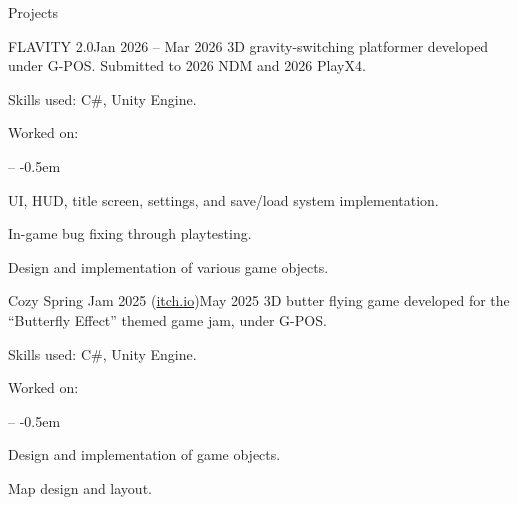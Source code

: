\documentclass{resume}
\begin{document}
\begin{res-section}{Projects}
  \begin{res-subsection}{FLAVITY 2.0}{Jan 2026 -- Mar 2026}
    3D gravity-switching platformer developed under G-POS. Submitted to 2026 NDM and 2026 PlayX4.

    \item Skills used: C\#, Unity Engine.
    \item Worked on:
    \vspace{-0.5em}
    \begin{list}{--}{}
      \itemsep -0.5em
      \item UI, HUD, title screen, settings, and save/load system implementation.
      \item In-game bug fixing through playtesting.
      \item Design and implementation of various game objects.
    \end{list}
  \end{res-subsection}

  \begin{res-subsection}{Cozy Spring Jam 2025 (\href{https://swm493.itch.io/butter-fly}{itch.io})}{May 2025}
    3D butter flying game developed for the ``Butterfly Effect'' themed game jam, under G-POS.

    \item Skills used: C\#, Unity Engine.
    \item Worked on:
    \vspace{-0.5em}
    \begin{list}{--}{}
      \itemsep -0.5em
      \item Design and implementation of game objects.
      \item Map design and layout.
    \end{list}
  \end{res-subsection}
\end{res-section}

\end{document}
